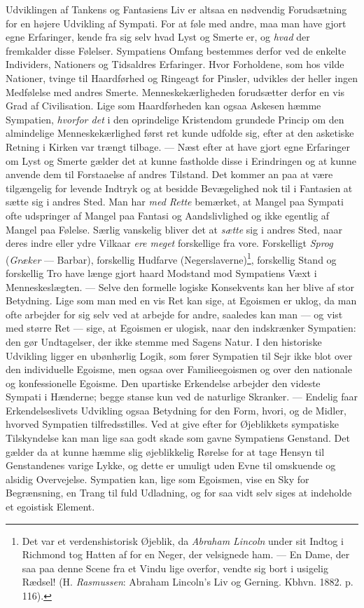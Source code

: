\documentclass[12pt,a4paper,openany]{book}
\newcommand{\opage}[1]{\marginnote{\footnotesize\textit{[#1]}}}
\begin{document}
Udviklingen af Tankens og Fantasiens Liv er altsaa en nødvendig
Forudsætning for en højere Udvikling af Sympati. For at føle med andre,
maa man have gjort egne Erfaringer, kende fra sig selv hvad Lyst og
Smerte er, og \emph{hvad} der fremkalder disse Følelser. Sympatiens
Omfang bestemmes derfor ved de enkelte Individers, Nationers og
Tidsaldres Erfaringer. Hvor Forholdene, som hos vilde Nationer, tvinge
til Haardførhed og Ringeagt for Pinsler, udvikles der heller ingen
Medfølelse med andres Smerte. Menneskekærligheden forudsætter derfor en
vis Grad af Civilisation. Lige som Haardførheden kan ogsaa Askesen hæmme
Sympatien, \emph{hvorfor det} i den oprindelige Kristendom grundede
Princip om den almindelige Menneskekærlighed først ret kunde udfolde
sig, efter at den asketiske Retning i Kirken var trængt tilbage. ---
Næst efter at have gjort egne Erfaringer om Lyst og Smerte gælder det at
kunne fastholde disse i Erindringen og at kunne anvende dem til
Forstaaelse af andres Tilstand. Det kommer an paa at være tilgængelig
for levende Indtryk og at besidde Bevægelighed nok til i Fantasien at
sætte sig i andres Sted. Man har \emph{med Rette} bemærket, at Mangel
paa Sympati ofte udspringer af Mangel paa Fantasi og Aandslivlighed og
ikke egentlig af Mangel paa Følelse. Særlig vanskelig bliver det at
\emph{sætte} sig i andres Sted, naar deres indre eller ydre Vilkaar
\emph{ere meget} forskellige fra vore. Forskelligt \emph{Sprog}
(\emph{Græker} --- Barbar), forskellig Hudfarve
(Negerslaverne)\footnote[1]{Det var et verdenshistorisk Øjeblik, da
\emph{Abraham Lincoln} under sit Indtog i Richmond tog Hatten af for en
Neger, der velsignede ham. --- En Dame, der saa paa denne Scene fra et
Vindu lige overfor, vendte sig bort i usigelig Rædsel! (H.
\emph{Rasmussen}: Abraham Lincoln’s Liv og Gerning. Kbhvn. 1882. p.
116).}, forskellig
\opage{307}Stand og forskellig Tro have længe gjort haard Modstand mod
Sympatiens Væxt i Menneskeslægten. --- Selve den formelle logiske
Konsekvents kan her blive af stor Betydning. Lige som man med en vis Ret
kan sige, at Egoismen er uklog, da man ofte arbejder for sig selv ved at
arbejde for andre, saaledes kan man --- og vist med større Ret --- sige,
at Egoismen er ulogisk, naar den indskrænker Sympatien: den gør
Undtagelser, der ikke stemme med Sagens Natur. I den historiske
Udvikling ligger en ubønhørlig Logik, som fører Sympatien til Sejr ikke
blot over den individuelle Egoisme, men ogsaa over Familieegoismen og
over den nationale og konfessionelle Egoisme. Den upartiske Erkendelse
arbejder den videste Sympati i Hænderne; begge stanse kun ved de
naturlige Skranker. --- Endelig faar Erkendelseslivets Udvikling ogsaa
Betydning for den Form, hvori, og de Midler, hvorved Sympatien
tilfredsstilles. Ved at give efter for Øjeblikkets sympatiske
Tilskyndelse kan man lige saa godt skade som gavne Sympatiens Genstand.
Det gælder da at kunne hæmme slig øjeblikkelig Rørelse for at tage
Hensyn til Genstandenes varige Lykke, og dette er umuligt uden Evne til
omskuende og alsidig Overvejelse. Sympatien kan, lige som Egoismen, vise
en Sky for Begrænsning, en Trang til fuld Udladning, og for saa vidt
selv siges at indeholde et egoistisk Element.
\end{document}
